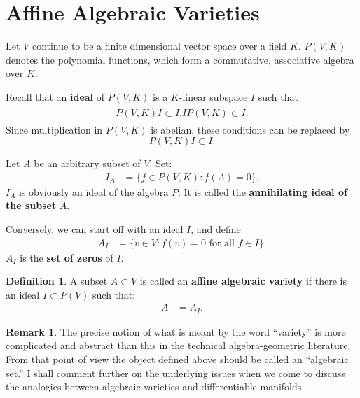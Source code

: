\documentclass[12pt]{book}
\theoremstyle{plain}
\theoremstyle{definition}
\newtheorem{definition}{Definition}[section]
\newtheorem*{remark}{Remark}
\begin{document}
\section{Affine Algebraic Varieties} \label{section:AffineAlgebraicVarieties}

Let $V$ continue to be a finite dimensional vector space over a field $K$.
$P(V, K)$ denotes the polynomial functions, which form a commutative, associative algebra over $K$.

Recall that an \textbf{ideal} of $P(V, K)$ is a $K$-linear subspace $I$ such that
\begin{align*}
\begin{split}
    P(V, K)I \subset I.
    IP(V, K) \subset I.
\end{split}
\end{align*}
Since multiplication in $P(V, K)$ is abelian, these conditions can be replaced by
$$P(V, K)I \subset I.$$

Let $A$ be an arbitrary subset of $V$.
Set:
\begin{align}
    I_A &= \{f \in P(V, K): f(A) = 0\}.
\end{align}
$I_A$ is obviously an ideal of the algebra $P$.
It is called the \textbf{annihilating ideal of the subset} $A$.

Conversely, we can start off with an ideal $I$, and define
\begin{align}
    A_I &= \{v \in V: f(v) = 0 \text{ for all } f \in I\}.
\end{align}
$A_I$ is the \textbf{set of zeros} of $I$.

\begin{definition}
    A subset $A \subset V$ is called an \textbf{affine algebraic variety} if there is an ideal $I \subset P(V)$ such that:
    \begin{align}
        A &= A_I.
    \end{align}
\end{definition}

\begin{remark}
    The precise notion of what is meant by the word ``variety'' is more complicated and abstract than this in the technical algebra-geometric literature.
    From that point of view the object defined above should be called an ``algebraic set.''
    I shall comment further on the underlying issues when we come to discuss the analogies between algebraic varieties and differentiable manifolds.
\end{remark}
\end{document}
